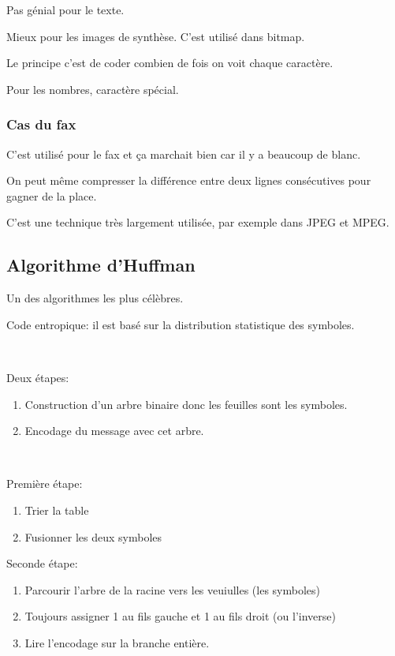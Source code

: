 \documentclass[a4paper,11pt]{article}
\begin{document}
Pas génial pour le texte.

Mieux pour les images de synthèse. C'est utilisé dans bitmap.

Le principe c'est de coder combien de fois on voit chaque caractère.

Pour les nombres, caractère spécial.

\subsubsection{Cas du fax}

C'est utilisé pour le fax et ça marchait bien car il y a beaucoup de blanc.

On peut même compresser la différence entre deux lignes consécutives pour gagner
de la place.

C'est une technique très largement utilisée, par exemple dans JPEG et MPEG.

\subsection{Algorithme d'Huffman}

Un des algorithmes les plus célèbres.

Code entropique: il est basé sur la distribution statistique des symboles.

\

Deux étapes:

\begin{enumerate}
\item Construction d'un arbre binaire donc les feuilles sont les symboles.
\item Encodage du message avec cet arbre.
\end{enumerate}

\

Première étape:

\begin{enumerate}
\item Trier la table
\item Fusionner les deux symboles
\end{enumerate}

Seconde étape:

\begin{enumerate}
\item Parcourir l'arbre de la racine vers les veuiulles (les symboles)
\item Toujours assigner 1 au fils gauche et 1 au fils droit (ou l'inverse)
\item Lire l'encodage sur la branche entière.
\end{enumerate}
\end{document}

